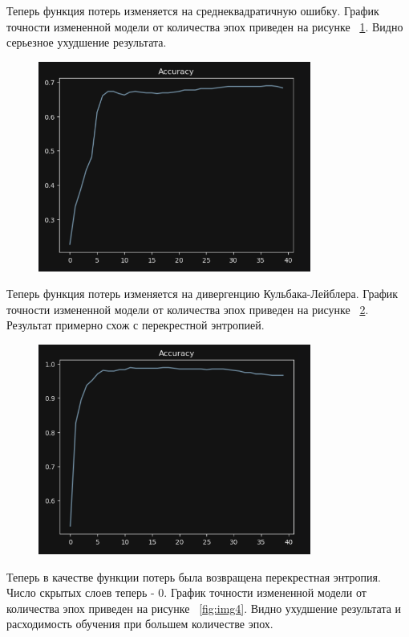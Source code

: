 \documentclass[a4paper, 14pt]{extarticle}
\begin{document}
Теперь функция потерь изменяется на среднеквадратичную ошибку. График точности измененной модели от количества эпох приведен на рисунке ~\ref{fig:img2}. Видно серьезное ухудшение результата.

\begin{figure}[H]
\centering
\includegraphics[width=0.8\textwidth]{images/res2.png}
\caption{}
\label{fig:img2}
\end{figure}

Теперь функция потерь изменяется на дивергенцию Кульбака-Лейблера. График точности измененной модели от количества эпох приведен на рисунке ~\ref{fig:img3}. Результат примерно схож с перекрестной энтропией.

\begin{figure}[H]
\centering
\includegraphics[width=0.8\textwidth]{images/res3.png}
\caption{}
\label{fig:img3}
\end{figure}

Теперь в качестве функции потерь была возвращена перекрестная энтропия. Число скрытых слоев теперь - 0. График точности измененной модели от количества эпох приведен на рисунке ~\ref{fig:img4}. Видно ухудшение результата и расходимость обучения при большем количестве эпох.
\end{document}
